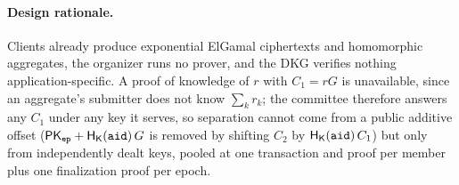 \paragraph{Design rationale.} Clients already produce exponential ElGamal ciphertexts and homomorphic aggregates, the organizer runs no prover, and the DKG verifies nothing application-specific. A proof of knowledge of $r$ with $C_1 = rG$ \cite{shoup2002threshold} is unavailable, since an aggregate's submitter does not know $\sum_k r_k$; the committee therefore answers any $C_1$ under any key it serves, so separation cannot come from a public additive offset ($\mathsf{PK}_{\mathtt{ep}} + \mathsf{H}_{\mathsf{K}}(\mathtt{aid})\,G$ \cite{bip32} is removed by shifting $C_2$ by $\mathsf{H}_{\mathsf{K}}(\mathtt{aid})\,C_1$) but only from independently dealt keys, pooled at one transaction and proof per member plus one finalization proof per epoch.
